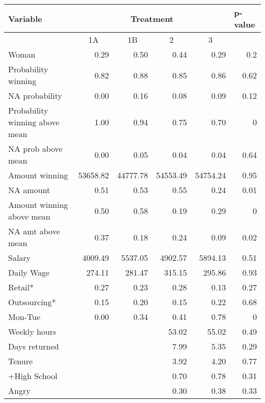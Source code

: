 \begin{tabular}{lrrrrc}
\toprule
Variable & \multicolumn{4}{c}{Treatment} & \multicolumn{1}{l}{p-value} \\
\midrule
\midrule
      & \multicolumn{1}{c}{1A} & \multicolumn{1}{c}{1B} & \multicolumn{1}{c}{2} & \multicolumn{1}{c}{3} &  \\
\midrule
Woman & 0.29  & 0.50  & 0.44  & 0.29  & \multicolumn{1}{r}{0.2} \\
Probability winning & 0.82  & 0.88  & 0.85  & 0.86  & \multicolumn{1}{r}{0.62} \\
NA probability & 0.00  & 0.16  & 0.08  & 0.09  & \multicolumn{1}{r}{0.12} \\
Probability winning above mean & 1.00  & 0.94  & 0.75  & 0.70  & \multicolumn{1}{r}{0} \\
NA prob above mean & 0.00  & 0.05  & 0.04  & 0.04  & \multicolumn{1}{r}{0.64} \\
Amount winning & 53658.82 & 44777.78 & 54553.49 & 54754.24 & \multicolumn{1}{r}{0.95} \\
NA amount & 0.51  & 0.53  & 0.55  & 0.24  & \multicolumn{1}{r}{0.01} \\
Amount winning above mean & 0.50  & 0.58  & 0.19  & 0.29  & \multicolumn{1}{r}{0} \\
NA amt above mean & 0.37  & 0.18  & 0.24  & 0.09  & \multicolumn{1}{r}{0.02} \\
Salary & 4009.49 & 5537.05 & 4902.57 & 5894.13 & \multicolumn{1}{r}{0.51} \\
Daily Wage & 274.11 & 281.47 & 315.15 & 295.86 & \multicolumn{1}{r}{0.93} \\
Retail* & 0.27  & 0.23  & 0.28  & 0.13  & \multicolumn{1}{r}{0.27} \\
Outsourcing* & 0.15  & 0.20  & 0.15  & 0.22  & \multicolumn{1}{r}{0.68} \\
Mon-Tue & 0.00  & 0.34  & 0.41  & 0.78  & \multicolumn{1}{r}{0} \\
Weekly hours &       &       & 53.02 & 55.02 & \multicolumn{1}{r}{0.49} \\
Days returned &       &       & 7.99  & 5.35  & \multicolumn{1}{r}{0.29} \\
Tenure &       &       & 3.92  & 4.20  & \multicolumn{1}{r}{0.77} \\
+High School &       &       & 0.70  & 0.78  & \multicolumn{1}{r}{0.31} \\
Angry &       &       & 0.30  & 0.38  & \multicolumn{1}{r}{0.33} \\

\end{tabular}
